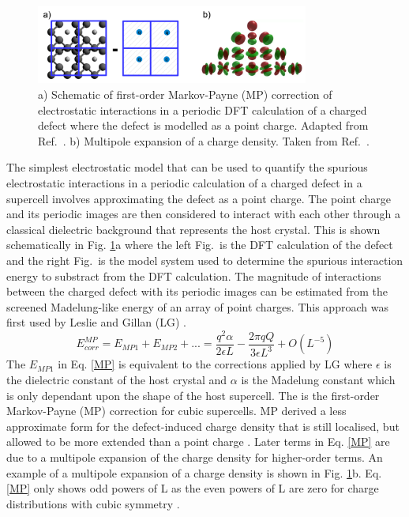 \documentclass[11pt, twoside]{report}
\begin{document}
\begin{figure}[h!]
  \centering
    \includegraphics[width=0.8\textwidth]{figures/IIC.png}
    \caption[a) Schematic of first-order Markov-Payne (MP) correction of electrostatic interactions in a periodic DFT calculation of a charged defect where the defect is modelled as a point charge.  b) Multipole expansion of a charge density.]{a) Schematic of first-order Markov-Payne (MP) correction of electrostatic interactions in a periodic DFT calculation of a charged defect where the defect is modelled as a point charge. Adapted from Ref.~. b) Multipole expansion of a charge density. Taken from Ref.~.}
  \label{IIC}
\end{figure}

The simplest electrostatic model that can be used to quantify the spurious electrostatic interactions in a periodic calculation of a charged defect in a supercell involves approximating the defect as a point charge. The point charge and its periodic images are then considered to interact with each other through a classical dielectric background that represents the host crystal. This is shown schematically in Fig. \ref{IIC}a where the left Fig.~is the DFT calculation of the defect and the right Fig.~is the model system used to determine the spurious interaction energy to substract from the DFT calculation. The magnitude of interactions between the charged defect with its periodic images can be estimated from the screened Madelung-like energy of an array of point charges. This approach was first used by Leslie and Gillan (LG) \cite{LeslieGillan}. 
\begin{equation}\label{MP}
E^{MP}_{corr} = E_{MP1} + E_{MP2} + ... = \frac{q^2\alpha}{2 \epsilon L} - \frac{2 \pi q Q}{3 \epsilon L^3} + O(L^{-5})
\end{equation}
The $E_{MP1}$ in Eq. \ref{MP} is equivalent to the corrections applied by LG where $\epsilon$ is the dielectric constant of the host crystal and $\alpha$ is the Madelung constant which is only dependant upon the shape of the host supercell. The is the first-order Markov-Payne (MP) correction for cubic supercells.
MP derived a less approximate form for the defect-induced charge density that is still localised, but allowed to be more extended than a point charge \cite{MP}. Later terms in Eq. \ref{MP} are due to a multipole expansion of the charge density for higher-order terms. An example of a multipole expansion of a charge density is shown in Fig. \ref{IIC}b. Eq. \ref{MP} only shows odd powers of L as the even powers of L are zero for charge distributions with cubic symmetry \cite{Durrant_defects}.
\end{document}
